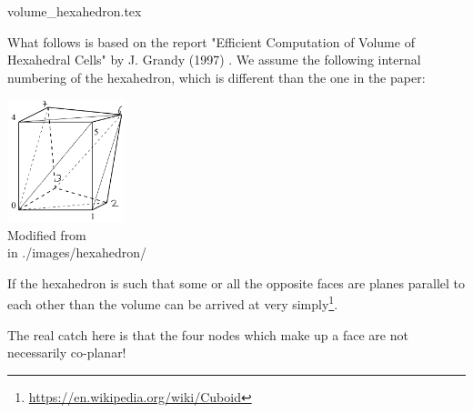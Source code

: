 \begin{flushright} {\tiny {\color{gray} volume\_hexahedron.tex}} \end{flushright}

What follows is based on the report "Efficient Computation of Volume of
Hexahedral Cells" by J. Grandy (1997) \cite{gran97}.
We assume the following internal numbering of the hexahedron,
which is different than the one in the paper: 

\begin{center}
\includegraphics[width=3.4cm]{images/hexahedron/gran97}\\
{\captionfont Modified from \cite{gran97}}\\
{\tiny {\color{gray} in ./images/hexahedron/}}
\end{center}

If the hexahedron is such that some or all the opposite faces are planes parallel to 
each other than the volume can be arrived at very 
simply\footnote{\url{https://en.wikipedia.org/wiki/Cuboid}}.

The real catch here is that the four nodes which make up a face are not 
necessarily co-planar!  


